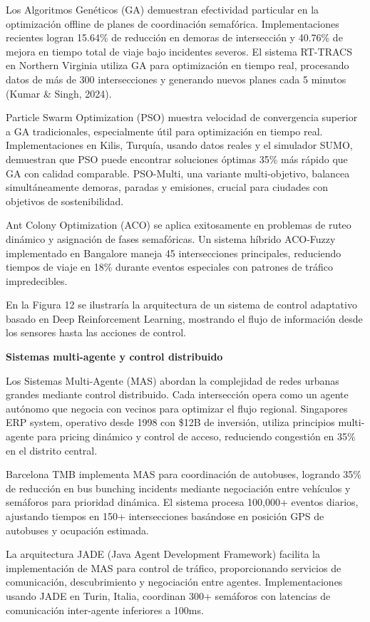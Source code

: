 \documentclass[12pt,a4paper,oneside]{report}
\begin{document}
Los Algoritmos Genéticos (GA) demuestran efectividad particular en la optimización offline de planes de coordinación semafórica. Implementaciones recientes logran 15.64\% de reducción en demoras de intersección y 40.76\% de mejora en tiempo total de viaje bajo incidentes severos. El sistema RT-TRACS en Northern Virginia utiliza GA para optimización en tiempo real, procesando datos de más de 300 intersecciones y generando nuevos planes cada 5 minutos (Kumar \& Singh, 2024).

Particle Swarm Optimization (PSO) muestra velocidad de convergencia superior a GA tradicionales, especialmente útil para optimización en tiempo real. Implementaciones en Kilis, Turquía, usando datos reales y el simulador SUMO, demuestran que PSO puede encontrar soluciones óptimas 35\% más rápido que GA con calidad comparable. PSO-Multi, una variante multi-objetivo, balancea simultáneamente demoras, paradas y emisiones, crucial para ciudades con objetivos de sostenibilidad.

Ant Colony Optimization (ACO) se aplica exitosamente en problemas de ruteo dinámico y asignación de fases semafóricas. Un sistema híbrido ACO-Fuzzy implementado en Bangalore maneja 45 intersecciones principales, reduciendo tiempos de viaje en 18\% durante eventos especiales con patrones de tráfico impredecibles.

En la Figura 12 se ilustraría la arquitectura de un sistema de control adaptativo basado en Deep Reinforcement Learning, mostrando el flujo de información desde los sensores hasta las acciones de control.

\textbf{Sistemas multi-agente y control distribuido}

Los Sistemas Multi-Agente (MAS) abordan la complejidad de redes urbanas grandes mediante control distribuido. Cada intersección opera como un agente autónomo que negocia con vecinos para optimizar el flujo regional. Singapore\textquotesingle s ERP system, operativo desde 1998 con \$12B de inversión, utiliza principios multi-agente para pricing dinámico y control de acceso, reduciendo congestión en 35\% en el distrito central.

Barcelona TMB implementa MAS para coordinación de autobuses, logrando 35\% de reducción en bus bunching incidents mediante negociación entre vehículos y semáforos para prioridad dinámica. El sistema procesa 100,000+ eventos diarios, ajustando tiempos en 150+ intersecciones basándose en posición GPS de autobuses y ocupación estimada.

La arquitectura JADE (Java Agent Development Framework) facilita la implementación de MAS para control de tráfico, proporcionando servicios de comunicación, descubrimiento y negociación entre agentes. Implementaciones usando JADE en Turin, Italia, coordinan 300+ semáforos con latencias de comunicación inter-agente inferiores a 100ms.
\end{document}
